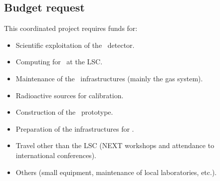 \subsection{Budget request}

%
%  
 
 This coordinated project requires funds for:
 \begin{itemize}[noitemsep,topsep=0pt,parsep=0pt,partopsep=0pt]
\item Scientific exploitation of the \Next\ detector. 
\item Computing for \Next\ at the LSC.
\item Maintenance of the \Next\ infrastructures (mainly the gas system). 
\item Radioactive sources for calibration. 
\item Construction of the \HDEMO\ prototype. 
\item Preparation of the infrastructures for \NHD.
\item Travel other than the LSC (NEXT workshops and attendance to international conferences).
\item Others (small equipment, maintenance of local laboratories, etc.). 
\end{itemize}

